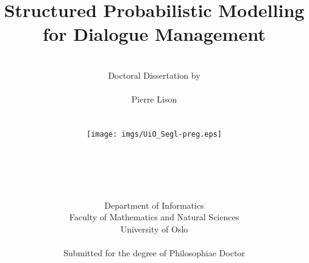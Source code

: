 \documentclass[english,12pt]{uiophd}
\title{\Huge{Structured Probabilistic Modelling \\ for Dialogue Management}}
\author{\\
Doctoral Dissertation by\\
\\
\Large{Pierre Lison} \\
\\
\\
 \texttt{[image: imgs/UiO\_Segl-preg.eps]}
\\
\\
\\
\\
\\
\\
 Department of Informatics\\
Faculty of Mathematics and Natural Sciences\\
University of Oslo\\
\\
Submitted for the degree of Philosophiae Doctor}
\begin{document}
\frontmatter
\maketitle

\chapterfont{\centering}





\chapterfont{\raggedright}

\tableofcontents

\mainmatter















\appendix





\backmatter




\newpage
{}

\printindex
\end{document}
